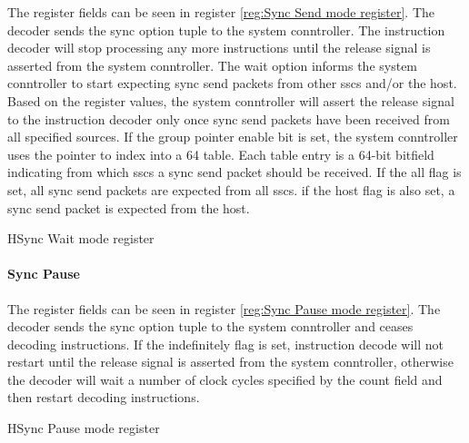 The register fields can be seen in register \ref{reg:Sync Send mode register}.
The decoder sends the sync option tuple to the system conntroller.
The instruction decoder will stop processing any more instructions until the release signal is asserted from the system conntroller.
The wait option informs the system conntroller to start expecting sync send packets from other \acp{ssc} and/or the host.
Based on the register values, the system conntroller will assert the release signal to the instruction decoder only once sync send packets have been received from all specified sources.
If the group pointer enable bit is set, the system conntroller uses the pointer to index into a 64 table. 
Each table entry is a 64-bit bitfield indicating from which \acp{ssc} a sync send packet should be received.
If the all flag is set, all sync send packets are expected from all \acp{ssc}.
if the host flag is also set, a sync send packet is expected from the host.
\begin{register}{H}{Sync Wait mode register}{}%
  \label{reg:Sync Wait mode register}
  \vspace{-20pt}
\end{register}


\paragraph{Sync Pause}

The register fields can be seen in register \ref{reg:Sync Pause mode register}.
The decoder sends the sync option tuple to the system conntroller and ceases decoding instructions.
If the indefinitely flag is set, instruction decode will not restart until the release signal is asserted from the system conntroller, otherwise the decoder will wait a number of clock cycles specified by the count field and then restart decoding instructions.
\begin{register}{H}{Sync Pause mode register}{}%
  \label{reg:Sync Pause mode register}
  \vspace{-10pt}
\end{register}


